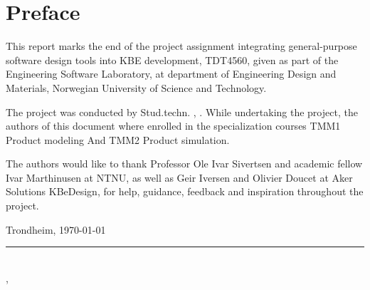 \section*{Preface}
This report marks the end of the project assignment integrating general-purpose software design tools into KBE development, TDT4560, given as part of the Engineering Software Laboratory, at department of Engineering Design and Materials, Norwegian University of Science and Technology. 

The project was conducted by Stud.techn. \myauthorA, \myauthorB. While undertaking the project, the authors of this document where enrolled in the specialization courses TMM1 Product modeling And TMM2 Product simulation.

The authors would like to thank Professor Ole Ivar Sivertsen and academic fellow Ivar Marthinusen at NTNU, as well as Geir Iversen and Olivier Doucet at Aker Solutions KBeDesign, for help, guidance, feedback and inspiration throughout the project.


Trondheim, \today


\rule{10cm}{0.5pt}\\
\indent \myauthorA, \myauthorB \\